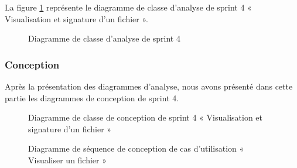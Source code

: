 La figure \ref{fig:class_analyse_4} représente le diagramme de classe d'analyse de sprint 4 « Visualisation et signature d'un fichier ».

\begin{figure}[H]
  \centering
  \caption{Diagramme de classe d'analyse de sprint 4}
  \label{fig:class_analyse_4}
\end{figure}



\subsubsection{Conception}

Après la présentation des diagrammes d'analyse, nous avons présenté dans cette partie les diagrammes de conception de sprint 4.
\newpage 
\begin{landscape}


\begin{figure}[H]
  \centering
  \caption{Diagramme de classe de conception de sprint 4 « Visualisation et signature d'un fichier »}
  \label{fig:class_diagram_4}
\end{figure}
\end{landscape}
\newpage


\begin{figure}[H]
  \centering
  \caption{Diagramme de séquence de conception de cas d'utilisation « Visualiser un fichier »}
  \label{fig:sequence_conception_view_file}
\end{figure}

